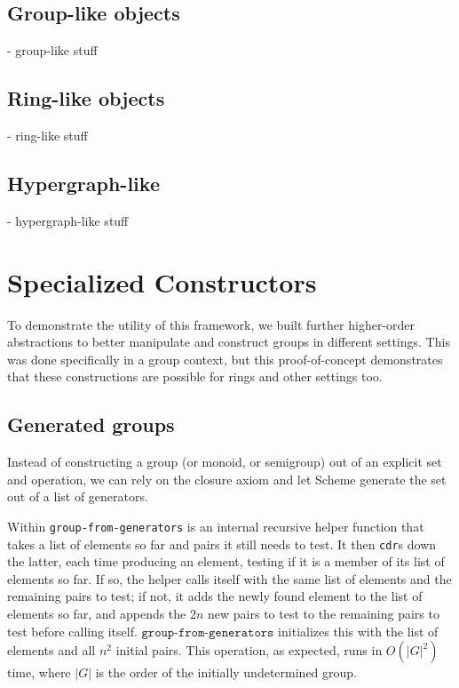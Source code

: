 \documentclass{article}
\begin{document}
            

        
        
        \subsection{Group-like objects}
            
            - group-like stuff
        
        
        \subsection{Ring-like objects}
            
            - ring-like stuff
        
        
        \subsection{Hypergraph-like}
            
            - hypergraph-like stuff
    
    
    \section{Specialized Constructors}
        
        To demonstrate the utility of this framework, we built further higher-order abstractions to better manipulate and construct groups in different settings. This was done specifically in a group context, but this proof-of-concept demonstrates that these constructions are possible for rings and other settings too.
        
        \subsection{Generated groups}
        \label{generated-groups}
        
            Instead of constructing a group (or monoid, or semigroup) out of an explicit set and operation, we can rely on the closure axiom and let Scheme generate the set out of a list of generators.
            
             Within \texttt{group-from-generators} is an internal recursive helper function that takes a list of elements so far and pairs it still needs to test. It then \texttt{cdr}s down the latter, each time producing an element, testing if it is a member of its list of elements so far. If so, the helper calls itself with the same list of elements and the remaining pairs to test; if not, it adds the newly found element to the list of elements so far, and appends the $2n$ new pairs to test to the remaining pairs to test before calling itself. $\texttt{group-from-generators}$ initializes this with the list of elements and all $n^2$ initial pairs. This operation, as expected, runs in $O(|G|^2)$ time, where $|G|$ is the order of the initially undetermined group. 
         
\end{document}
